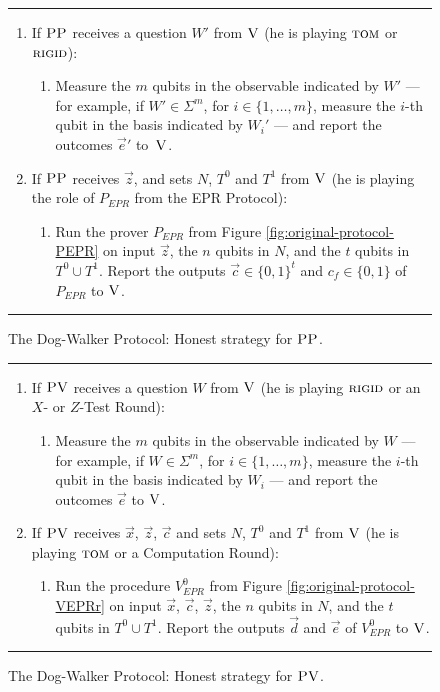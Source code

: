\documentclass[11pt]{article}
\theoremstyle{remark}
\theoremstyle{definition}
\newcommand{\rigid}{\textsc{rigid}}
\newcommand{\tom}{\textsc{tom}}
\newcommand{\ver}{\textsc{V}}
\newcommand{\pv}{\textsc{PV}}
\newcommand{\pp}{\textsc{PP}}
\begin{document}
\begin{figure}[H]
\rule[1ex]{16.5cm}{0.5pt}
\vspace{-20pt}
\begin{enumerate}
  \item If $\pp$ receives a question ${W}'$ from $\ver$ (he is playing $\tom$ or $\rigid$):
\begin{enumerate}
     \item[]  Measure the $m$ qubits in the observable indicated by $W'$ --- for example, if $W'\in\Sigma^m$, for $i\in \{1,\ldots,m\}$, measure the $i$-th qubit in the basis indicated by $W_i'$ --- and report
       the outcomes $\vec{e}'$ to~$\ver$.
\end{enumerate}
\item If $\pp$ receives $\vec{z}$, and sets $N$, $T^0$ and $T^1$ from $\ver$ (he is playing the role of $P_{EPR}$ from the EPR Protocol):
\begin{enumerate}
     \item[] Run the prover $P_{EPR}$ from Figure \ref{fig:original-protocol-PEPR} on input $\vec{z}$, the $n$ qubits in $N$, and the $t$ qubits in $T^0\cup T^1$.
     Report the outputs $\vec{c}\in\{0,1\}^t$ and $c_f\in\{0,1\}$ of $P_{EPR}$  to $\ver$. 
\end{enumerate}
\end{enumerate}
\rule[2ex]{16.5cm}{0.5pt}\vspace{-.5cm}
\caption{The Dog-Walker Protocol: Honest strategy for $\pp$.}\label{fig:dogwalker-protocol-PP}
\end{figure}


\begin{figure}[H]
\rule[1ex]{16.5cm}{0.5pt}
\vspace{-20pt}
\begin{enumerate}
  \item If $\pv$ receives a question ${W}$ from $\ver$ (he is playing $\rigid$ or an $X$- or $Z$-Test Round):
\begin{enumerate}
     \item[]  Measure the $m$ qubits in the observable indicated by $W$ --- for example, if $W\in \Sigma^m$, for $i\in \{1,\ldots,m\}$, measure the $i$-th qubit in the basis indicated by $W_i$ --- and report the outcomes $\vec{e}$ to $\ver$.
\end{enumerate}

  \item If $\pv$ receives $\vec{x}$, $\vec{z}$, $\vec{c}$ and sets $N$, $T^0$ and $T^1$ from $\ver$ (he is playing $\tom$ or a Computation Round):
\begin{enumerate}
	\item[] Run the procedure $V_{EPR}^0$ from Figure \ref{fig:original-protocol-VEPRr} on input $\vec{x}$, $\vec{c}$, $\vec{z}$, the $n$ qubits in $N$, and the $t$ qubits in $T^0\cup T^1$. Report the outputs  $\vec{d}$ and $\vec{e}$ of $V_{EPR}^0$ to $\ver$.
\end{enumerate}
\end{enumerate}
\rule[2ex]{16.5cm}{0.5pt}\vspace{-.5cm}
\caption{The Dog-Walker Protocol: Honest strategy for $\pv$.}\label{fig:dogwalker-protocol-PV}
\end{figure}
\end{document}
